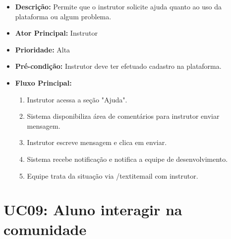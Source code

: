         \begin{itemize}
            \item \textbf{Descrição:} Permite que o instrutor solicite ajuda quanto ao uso da plataforma ou algum problema.
            
            \item \textbf{Ator Principal:} Instrutor
            
            \item \textbf{Prioridade:} Alta
            
            \item \textbf{Pré-condição:} Instrutor deve ter efetuado cadastro na plataforma.
            
            \item \textbf{Fluxo Principal:}
            \begin{enumerate}
                \item Instrutor acessa a seção "Ajuda".
                \item Sistema disponibiliza área de comentários para instrutor enviar mensagem.
                \item Instrutor escreve mensagem e clica em enviar.
                \item Sistema recebe notificação e notifica a equipe de desenvolvimento.
                \item Equipe trata da situação via /textit{email} com instrutor.
            \end{enumerate}
        \end{itemize}

        \section*{UC09: Aluno interagir na comunidade}

